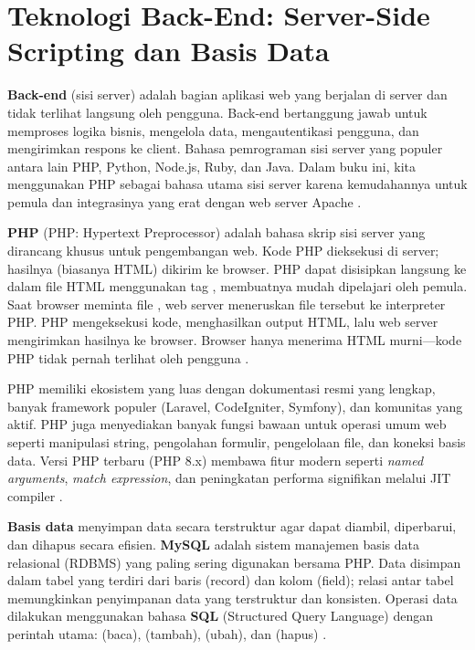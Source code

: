 ﻿\section{Teknologi Back-End: Server-Side Scripting dan Basis Data}
\textbf{Back-end} (sisi server) adalah bagian aplikasi web yang berjalan di server dan tidak terlihat langsung oleh pengguna. Back-end bertanggung jawab untuk memproses logika bisnis, mengelola data, mengautentikasi pengguna, dan mengirimkan respons ke client. Bahasa pemrograman sisi server yang populer antara lain PHP, Python, Node.js, Ruby, dan Java. Dalam buku ini, kita menggunakan PHP sebagai bahasa utama sisi server karena kemudahannya untuk pemula dan integrasinya yang erat dengan web server Apache \cite{phpManual}.

\textbf{PHP} (PHP: Hypertext Preprocessor) adalah bahasa skrip sisi server yang dirancang khusus untuk pengembangan web. Kode PHP dieksekusi di server; hasilnya (biasanya HTML) dikirim ke browser. PHP dapat disisipkan langsung ke dalam file HTML menggunakan tag , membuatnya mudah dipelajari oleh pemula. Saat browser meminta file , web server meneruskan file tersebut ke interpreter PHP. PHP mengeksekusi kode, menghasilkan output HTML, lalu web server mengirimkan hasilnya ke browser. Browser hanya menerima HTML murni---kode PHP tidak pernah terlihat oleh pengguna \cite{phpRightWay}.

PHP memiliki ekosistem yang luas dengan dokumentasi resmi yang lengkap, banyak framework populer (Laravel, CodeIgniter, Symfony), dan komunitas yang aktif. PHP juga menyediakan banyak fungsi bawaan untuk operasi umum web seperti manipulasi string, pengolahan formulir, pengelolaan file, dan koneksi basis data. Versi PHP terbaru (PHP 8.x) membawa fitur modern seperti \textit{named arguments}, \textit{match expression}, dan peningkatan performa signifikan melalui JIT compiler \cite{phpManual}.

\textbf{Basis data} menyimpan data secara terstruktur agar dapat diambil, diperbarui, dan dihapus secara efisien. \textbf{MySQL} adalah sistem manajemen basis data relasional (RDBMS) yang paling sering digunakan bersama PHP. Data disimpan dalam tabel yang terdiri dari baris (record) dan kolom (field); relasi antar tabel memungkinkan penyimpanan data yang terstruktur dan konsisten. Operasi data dilakukan menggunakan bahasa \textbf{SQL} (Structured Query Language) dengan perintah utama:  (baca),  (tambah),  (ubah), dan  (hapus) \cite{mysqlDocs}.

